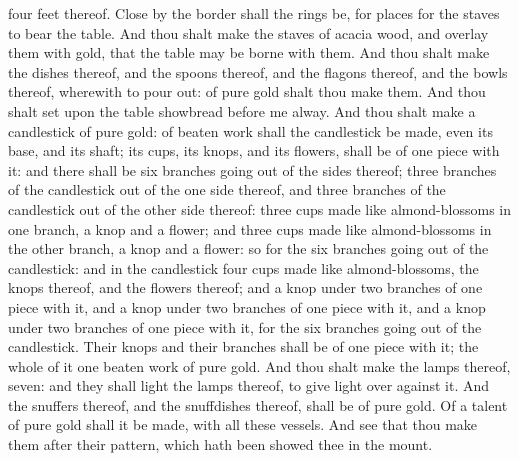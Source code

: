 four feet thereof. Close by the border shall the rings be, for places for the staves to bear the table. And thou shalt make the staves of acacia wood, and overlay them with gold, that the table may be borne with them. And thou shalt make the dishes thereof, and the spoons thereof, and the flagons thereof, and the bowls thereof, wherewith to pour out: of pure gold shalt thou make them. And thou shalt set upon the table showbread before me alway.  And thou shalt make a candlestick of pure gold: of beaten work shall the candlestick be made, even its base, and its shaft; its cups, its knops, and its flowers, shall be of one piece with it: and there shall be six branches going out of the sides thereof; three branches of the candlestick out of the one side thereof, and three branches of the candlestick out of the other side thereof: three cups made like almond-blossoms in one branch, a knop and a flower; and three cups made like almond-blossoms in the other branch, a knop and a flower: so for the six branches going out of the candlestick: and in the candlestick four cups made like almond-blossoms, the knops thereof, and the flowers thereof; and a knop under two branches of one piece with it, and a knop under two branches of one piece with it, and a knop under two branches of one piece with it, for the six branches going out of the candlestick. Their knops and their branches shall be of one piece with it; the whole of it one beaten work of pure gold. And thou shalt make the lamps thereof, seven: and they shall light the lamps thereof, to give light over against it. And the snuffers thereof, and the snuffdishes thereof, shall be of pure gold. Of a talent of pure gold shall it be made, with all these vessels. And see that thou make them after their pattern, which hath been showed thee in the mount. 

